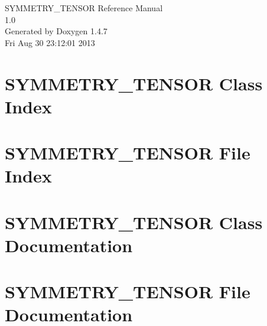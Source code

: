 \documentclass[a4paper]{book}
\begin{document}
\begin{titlepage}
\vspace*{7cm}
\begin{center}
{\Large SYMMETRY\_\-TENSOR Reference Manual\\[1ex]\large 1.0 }\\
\vspace*{1cm}
{\large Generated by Doxygen 1.4.7}\\
\vspace*{0.5cm}
{\small Fri Aug 30 23:12:01 2013}\\
\end{center}
\end{titlepage}
\clearemptydoublepage
{}
\tableofcontents
\clearemptydoublepage
{}
\chapter{SYMMETRY\_\-TENSOR Class Index}

\chapter{SYMMETRY\_\-TENSOR File Index}

\chapter{SYMMETRY\_\-TENSOR Class Documentation}


\chapter{SYMMETRY\_\-TENSOR File Documentation}


\printindex
\end{document}
